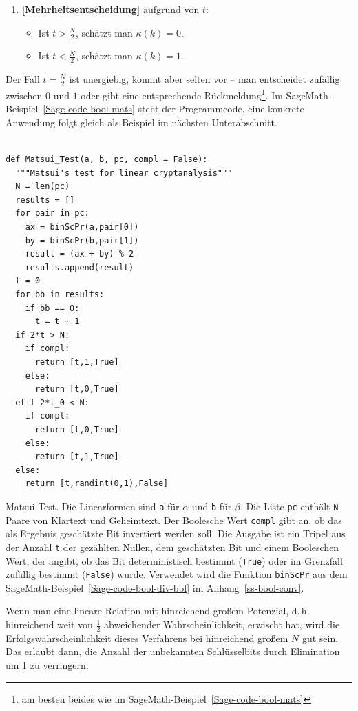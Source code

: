 \begin{refsegment}
\begin{enumerate}
	\item \textbf{[Mehrheitsentscheidung]} aufgrund von $t$:
	  \begin{itemize}
	    \item Ist $t > \frac{N}{2}$, schätzt man $\kappa(k) = 0$.
	    \item Ist $t < \frac{N}{2}$, schätzt man $\kappa(k) = 1$.
	  \end{itemize}
\end{enumerate}
Der Fall $t = \frac{N}{2}$ ist unergiebig, kommt aber selten vor -- man
entscheidet zufällig zwischen $0$ und $1$ oder gibt eine entsprechende
Rückmeldung\footnote{%
   am besten beides wie im SageMath-Beispiel~\ref{Sage-code-bool-mats}
}. Im SageMath-Beispiel~\ref{Sage-code-bool-mats}
steht der Programmcode, eine konkrete Anwendung folgt gleich als Beispiel
im nächsten Unterabschnitt.

\begin{sagecode}
\begin{verbatim}

def Matsui_Test(a, b, pc, compl = False):
  """Matsui's test for linear cryptanalysis"""
  N = len(pc)
  results = []
  for pair in pc:
    ax = binScPr(a,pair[0])
    by = binScPr(b,pair[1])
    result = (ax + by) % 2
    results.append(result)
  t = 0
  for bb in results:
    if bb == 0:
      t = t + 1
  if 2*t > N:
    if compl:
      return [t,1,True]
    else:
      return [t,0,True]
  elif 2*t_0 < N:
    if compl:
      return [t,0,True]
    else:
      return [t,1,True]
  else:
    return [t,randint(0,1),False]
\end{verbatim}
\caption{Matsui-Test. Die Linearformen sind {\tt a} für $\alpha$ und
   {\tt b} für $\beta$. Die Liste {\tt pc} enthält {\tt N} Paare von Klartext
   und Geheimtext. Der Boolesche Wert {\tt compl} gibt an, ob das
   als Ergebnis geschätzte Bit invertiert werden soll. Die Ausgabe
   ist ein Tripel aus der Anzahl {\tt t} der gezählten Nullen,
   dem geschätzten Bit und einem Booleschen Wert, der angibt, ob das
   Bit deterministisch bestimmt ({\tt True}) oder im Grenzfall
   zufällig bestimmt ({\tt False}) wurde. Verwendet wird die Funktion
   {\tt binScPr} aus dem SageMath-Beispiel~\ref{Sage-code-bool-div-bbl}
   im Anhang~\ref{ss-bool-conv}.}\label{Sage-code-bool-mats}
\end{sagecode}

Wenn man eine lineare Relation
mit hinreichend großem Potenzial, d.\,h.
hinreichend weit von $\frac{1}{2}$ abweichender Wahrscheinlichkeit, erwischt hat,
wird die Erfolgswahrscheinlichkeit dieses Verfahrens bei hinreichend
großem $N$ gut sein. Das erlaubt dann, die Anzahl der unbekannten
Schlüsselbits durch Elimination um 1 zu verringern.


\end{refsegment}
